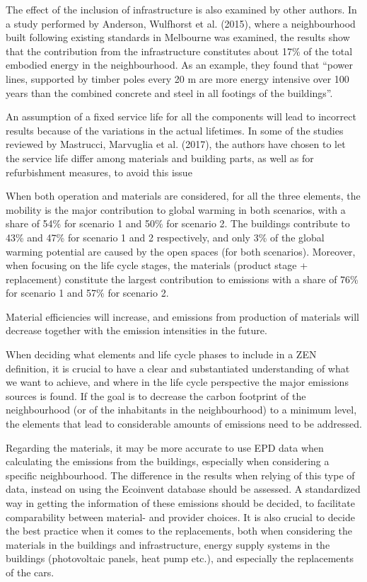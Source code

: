The effect of the inclusion of infrastructure is also examined by other authors. In a study performed by Anderson, Wulfhorst et al. (2015), where a neighbourhood built following existing standards in Melbourne was examined, the results show that the contribution from the infrastructure constitutes about 17\% of the total embodied energy in the neighbourhood. As an example, they found that “power lines, supported by timber poles every 20 m are more energy intensive over 100 years than the combined concrete and steel in all footings of the buildings”.

An assumption of a fixed service life for all the components will lead to incorrect results because of the variations in the actual lifetimes. In some of the studies reviewed by Mastrucci, Marvuglia et al. (2017), the authors have chosen to let the service life differ among materials and building parts, as well as for refurbishment measures, to avoid this issue


When both operation and materials are considered, for all the three elements, the mobility is the major contribution to global warming in both scenarios, with a share of 54\% for scenario 1 and 50\% for scenario 2. The buildings contribute to 43\% and 47\% for scenario 1 and 2 respectively, and only 3\% of the global warming potential are caused by the open spaces (for both scenarios).
Moreover, when focusing on the life cycle stages, the materials (product stage + replacement) constitute the largest contribution to emissions with a share of 76\% for scenario 1 and 57\% for scenario 2.

Material efficiencies will increase, and emissions from production of materials will decrease together with the emission intensities in the future. 

When deciding what elements and life cycle phases to include in a ZEN definition, it is crucial to have a clear and substantiated understanding of what we want to achieve, and where in the life cycle perspective the major emissions sources is found. If the goal is to decrease the carbon footprint of the neighbourhood (or of the inhabitants in the neighbourhood) to a minimum level, the elements that lead to considerable amounts of emissions need to be addressed. 

Regarding the materials, it may be more accurate to use EPD data when calculating the emissions from the buildings, especially when considering a specific neighbourhood. The difference in the results when relying of this type of data, instead on using the Ecoinvent database should be assessed. A standardized way in getting the information of these emissions should be decided, to facilitate comparability between material- and provider choices. It is also crucial to decide the best practice when it comes to the replacements, both when considering the materials in the buildings and infrastructure, energy supply systems in the buildings (photovoltaic panels, heat pump etc.), and especially the replacements of the cars.

